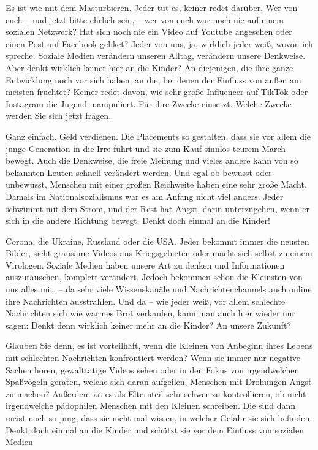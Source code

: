 Es ist wie mit dem Masturbieren. Jeder tut es, keiner redet darüber. Wer von euch – und jetzt bitte ehrlich sein, – wer von euch war noch nie auf einem sozialen Netzwerk? Hat sich noch nie ein Video auf Youtube angesehen oder einen Post auf Facebook geliket? Jeder von uns, ja, wirklich jeder weiß, wovon ich spreche. Soziale Medien verändern unseren Alltag, verändern unsere Denkweise. Aber denkt wirklich keiner hier an die Kinder? An diejenigen, die ihre ganze Entwicklung noch vor sich haben, an die, bei denen der Einfluss von außen am meisten fruchtet? Keiner redet davon, wie sehr große Influencer auf TikTok oder Instagram die Jugend manipuliert. Für ihre Zwecke einsetzt. Welche Zwecke werden Sie sich jetzt fragen.  

Ganz einfach. Geld verdienen. Die Placements so gestalten, dass sie vor allem die junge Generation in die Irre führt und sie zum Kauf sinnlos teurem March bewegt. Auch die Denkweise, die freie Meinung und vieles andere kann von so bekannten Leuten schnell verändert werden. Und egal ob bewusst oder unbewusst, Menschen mit einer großen Reichweite haben eine sehr große Macht. Damals im Nationalsozialismus war es am Anfang nicht viel anders. Jeder schwimmt mit dem Strom, und der Rest hat Angst, darin unterzugehen, wenn er sich in die andere Richtung bewegt. Denkt doch einmal an die Kinder! 

Corona, die Ukraine, Russland oder die USA. Jeder bekommt immer die neusten Bilder, sieht grausame Videos aus Kriegsgebieten oder macht sich selbst zu einem Virologen. Soziale Medien haben unsere Art zu denken und Informationen auszutauschen, komplett verändert. Jedoch bekommen schon die Kleinsten von uns alles mit, – da sehr viele Wissenskanäle und Nachrichtenchannels auch online ihre Nachrichten ausstrahlen. Und da – wie jeder weiß, vor allem schlechte Nachrichten sich wie warmes Brot verkaufen, kann man auch hier wieder nur sagen: Denkt denn wirklich keiner mehr an die Kinder? An unsere Zukunft? 

Glauben Sie denn, es ist vorteilhaft, wenn die Kleinen von Anbeginn ihres Lebens mit schlechten Nachrichten konfrontiert werden? Wenn sie immer nur negative Sachen hören, gewalttätige Videos sehen oder in den Fokus von irgendwelchen Spaßvögeln geraten, welche sich daran aufgeilen, Menschen mit Drohungen Angst zu machen? Außerdem ist es als Elternteil sehr schwer zu kontrollieren, ob nicht irgendwelche pädophilen Menschen mit den Kleinen schreiben. Die sind dann meist noch so jung, dass sie nicht mal wissen, in welcher Gefahr sie sich befinden. Denkt doch einmal an die Kinder und schützt sie vor dem Einfluss von sozialen Medien 

